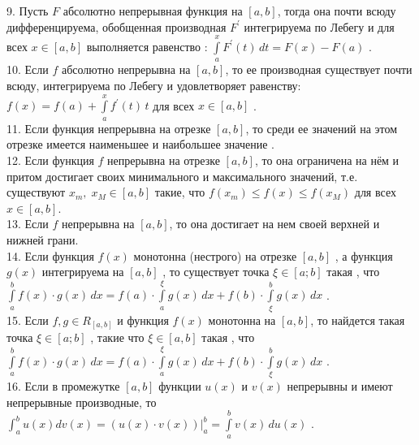 \documentclass[12pt]{article}
\begin{document}
9. Пусть ${\displaystyle F}$ абсолютно непрерывная функция на ${\displaystyle [a,b]}$, тогда она почти всюду дифференцируема, обобщенная производная ${\displaystyle F^{\prime}}$ интегрируема по Лебегу и для всех ${\displaystyle x \in [a,b]}$ выполняется равенство : ${\displaystyle \int \limits _{a}^{x} F^{\prime}(t) \, dt=F(x)-F(a)}$ .\\

10. Если  ${\displaystyle f}$ абсолютно непрерывна на ${\displaystyle [a,b]}$, то ее производная существует почти всюду, интегрируема по Лебегу и удовлетворяет равенству: ${\displaystyle f(x)=f(a)+\int \limits _{a}^{x} f^{\prime}(t) \, t}$ для всех ${\displaystyle x \in [a,b]}$ .\\

11. Если функция непрерывна на отрезке  ${\displaystyle [a,b]}$, то среди ее значений на этом отрезке имеется наименьшее и наибольшее значение .\\

12. Если функция ${\displaystyle f}$ непрерывна на отрезке ${\displaystyle [a,b]}$, то она ограничена на нём и притом достигает своих минимального и максимального значений, т.е. существуют ${\displaystyle x_{m},\;x_{M}\in [a,b]}$ такие, что ${\displaystyle f(x_{m})\leq f(x)\leq f(x_{M})}$ для всех ${\displaystyle x\in [a,b]}$.\\

13. Если ${\displaystyle f}$ непрерывна на ${\displaystyle [a,b]}$, то она достигает на нем своей верхней и нижней грани.\\

14. Если функция ${\displaystyle f(x)}$ монотонна (нестрого) на отрезке ${\displaystyle [a,b]}$ , а функция ${\displaystyle g(x)}$ интегрируема на ${\displaystyle [a,b]}$ , то существует точка  ${\displaystyle \xi \in [a;b]}$ такая , что ${\displaystyle \int \limits _{a}^{b} f(x)\cdot g(x)\, dx=f(a)\cdot \int \limits _{a}^{\xi} g(x)\, dx+f(b)\cdot \int \limits _{\xi}^{b} g(x)\, dx }$ .\\

15. Если ${\displaystyle f,g \in R_{[a,b]}}$ и функция ${\displaystyle f(x)}$ монотонна на ${\displaystyle [a,b]}$, то найдется такая точка ${\displaystyle \xi \in [a;b]}$ , такие что ${\displaystyle \xi \in [a,b]}$ такая , что ${\displaystyle \int \limits _{a}^{b} f(x)\cdot g(x)\, dx=f(a)\cdot \int \limits _{a}^{\xi} g(x)\, dx+f(b)\cdot \int \limits _{\xi}^{b} g(x)\, dx }$ .\\

16. Если в промежутке  ${\displaystyle [a,b]}$ функции ${\displaystyle u(x)}$ и  ${\displaystyle v(x)}$ непрерывны и имеют непрерывные производные, то ${\displaystyle \int _{a}^{b} u(x)dv(x)=(u(x)\cdot v(x)){\vert}^{b}_{a}=\int \limits _{a}^{b} v(x)\, du(x)}$ .\\
\end{document}
